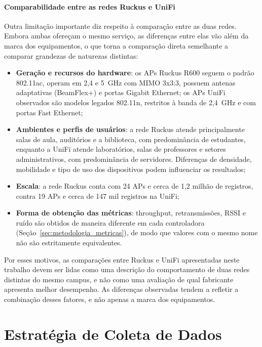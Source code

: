 \paragraph{Comparabilidade entre as redes Ruckus e UniFi}
\label{par:metodologia_comparabilidade}
Outra limitação importante diz respeito à comparação entre as duas redes. Embora ambas ofereçam o mesmo serviço, as diferenças entre elas vão além da marca dos equipamentos, o que torna a comparação direta semelhante a comparar grandezas de naturezas distintas:
\begin{itemize}
	\item \textbf{Geração e recursos do hardware}: os APs Ruckus R600 seguem o padrão 802.11ac, operam em 2,4 e 5~GHz com MIMO 3x3:3, possuem antenas adaptativas (BeamFlex+) e portas Gigabit Ethernet; os APs UniFi observados são modelos legados 802.11n, restritos à banda de 2,4~GHz e com portas Fast Ethernet;
	\item \textbf{Ambientes e perfis de usuários}: a rede Ruckus atende principalmente salas de aula, auditórios e a biblioteca, com predominância de estudantes, enquanto a UniFi atende laboratórios, salas de professores e setores administrativos, com predominância de servidores. Diferenças de densidade, mobilidade e tipo de uso dos dispositivos podem influenciar os resultados;
	\item \textbf{Escala}: a rede Ruckus conta com 24 APs e cerca de 1,2 milhão de registros, contra 19 APs e cerca de 147 mil registros na UniFi;
	\item \textbf{Forma de obtenção das métricas}: throughput, retransmissões, RSSI e ruído são obtidos de maneira diferente em cada controladora (Seção~\ref{sec:metodologia_metricas}), de modo que valores com o mesmo nome não são estritamente equivalentes.
\end{itemize}
Por esses motivos, as comparações entre Ruckus e UniFi apresentadas neste trabalho devem ser lidas como uma descrição do comportamento de duas redes distintas do mesmo campus, e não como uma avaliação de qual fabricante apresenta melhor desempenho. As diferenças observadas tendem a refletir a combinação desses fatores, e não apenas a marca dos equipamentos.


\section{Estratégia de Coleta de Dados}
\label{sec:metodologia_coleta}

